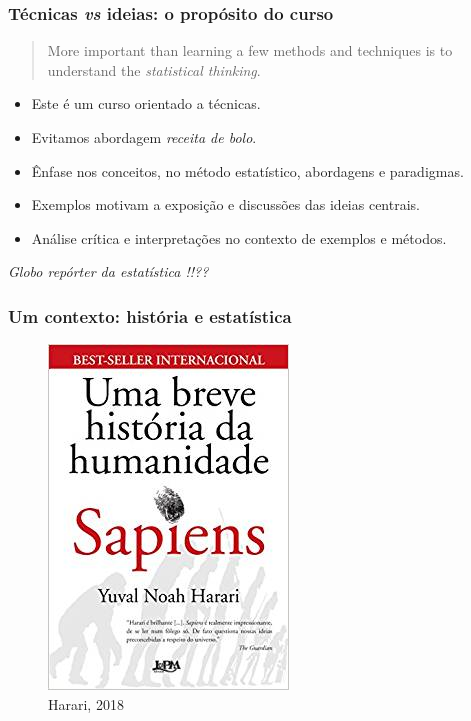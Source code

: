 \documentclass[handout,serif, professionalfont, usenames, dvipsnames, aspectratio = 169]{beamer}\usepackage[]{graphicx}\usepackage[]{color}
\begin{document}
\begin{frame}
  \frametitle{Técnicas {\it vs} ideias: o propósito do curso}
  
  \begin{quote}
    More important than learning a few methods and techniques is to understand
    the {\it statistical thinking}.\\
    \hfill \cite{box+hunter+hunter:2005}
  \end{quote}
  
  \pause
  
  \begin{itemize}
    \item Este  é um curso orientado a técnicas. 
    \item Evitamos abordagem \textit{receita de bolo}. 
    \item Ênfase nos conceitos, no método estatístico, abordagens e paradigmas. 
    \item Exemplos motivam a exposição e discussões das ideias centrais.
    \item Análise crítica e interpretações no contexto de exemplos e métodos.
  \end{itemize}
  \pause
  \textit{Globo repórter da estatística !!??}
\end{frame}


\begin{frame}
  \frametitle{Um contexto: história e estatística}

\begin{figure}
    \centering
    \includegraphics[width=.3\linewidth]{./pics/sapiens.jpeg}
    \caption{Harari, 2018}
\nocite{harari}
\end{figure}

\end{frame}
\end{document}

